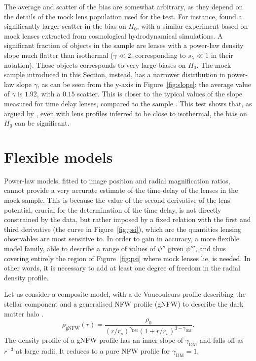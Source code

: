 \documentclass[usenatbib]{mnras}
\def\psiii{\psi''}
\def\psiiii{\psi'''}
\def\gammadm{\gamma_{\mathrm{DM}}}
\def\Fref#1{Figure~\ref{#1}\xspace}
\begin{document}
The average and scatter of the bias are somewhat arbitrary, as they depend on the details of the mock lens population used for the test. 
For instance, \citet{Xu++16} found a significantly larger scatter in the bias on $H_0$, with a similar experiment based on mock lenses extracted from cosmological hydrodynamical simulations.
A significant fraction of objects in the \citet{Xu++16} sample are lenses with a power-law density slope much flatter than isothermal ($\gamma \ll 2$, corresponding to $s_\lambda \ll 1$ in their notation). Those objects corresponds to very large biases on $H_0$.
The mock sample introduced in this Section, instead, has a narrower distribution in power-law slope $\gamma$, as can be seen from the y-axis in \Fref{fig:slope}: the average value of $\gamma$ is $1.92$, with a $0.15$ scatter. This is closer to the typical values of the slope measured for time delay lenses, compared to the \citet{Xu++16} sample \citep[see e.g.][]{Suy++10, Suy++13, Agn++16, Won++17}.
This test shows that, as argued by \citet{Xu++16}, even with lens profiles inferred to be close to isothermal, the bias on $H_0$ can be significant.

\section{Flexible models}\label{sect:gnfw}

Power-law models, fitted to image position and radial magnification ratios, cannot provide a very accurate estimate of the time-delay of the lenses in the mock sample. This is because the value of the second derivative of the lens potential, crucial for the determination of the time delay, is not directly constrained by the data, but rather imposed by a fixed relation with the first and third derivative (the curve in \Fref{fig:psi}), which are the quantities lensing observables are most sensitive to. 
In order to gain in accuracy, a more flexible model family, able to describe a range of values of $\psiii$ given $\psiiii$, and thus covering entirely the region of \Fref{fig:psi} where mock lenses lie, is needed.
In other words, it is necessary to add at least one degree of freedom in the radial density profile.

Let us consider a composite model, with a de Vaucouleurs profile describing the stellar component and a generalised NFW profile (gNFW) to describe the dark matter halo \citep{Zha96}.
\begin{equation}
\rho_{\mathrm{gNFW}}(r) = \frac{\rho_0}{(r/r_s)^{\gammadm} (1 + r/r_s)^{3 - \gammadm}}.
\end{equation}
The density profile of a gNFW profile has an inner slope of $\gammadm$ and falls off as $r^{-3}$ at large radii. It reduces to a pure NFW profile for $\gammadm=1$.
\end{document}
